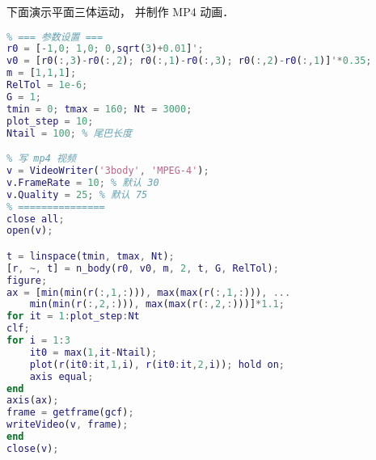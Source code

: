 下面演示平面三体运动， 并制作 MP4 动画．
\begin{lstlisting}[language=matlab, caption=three\_body.m]
% 平面三体运动演示
% === 参数设置 ===
r0 = [-1,0; 1,0; 0,sqrt(3)+0.01]';
v0 = [r0(:,3)-r0(:,2); r0(:,1)-r0(:,3); r0(:,2)-r0(:,1)]'*0.35;
m = [1,1,1];
RelTol = 1e-6;
G = 1;
tmin = 0; tmax = 160; Nt = 3000;
plot_step = 10;
Ntail = 100; % 尾巴长度

% 写 mp4 视频
v = VideoWriter('3body', 'MPEG-4');
v.FrameRate = 10; % 默认 30
v.Quality = 25; % 默认 75
% ===============
close all;
open(v);

t = linspace(tmin, tmax, Nt);
[r, ~, t] = n_body(r0, v0, m, 2, t, G, RelTol);
figure;
ax = [min(min(r(:,1,:))), max(max(r(:,1,:))), ...
    min(min(r(:,2,:))), max(max(r(:,2,:)))]*1.1;
for it = 1:plot_step:Nt
clf;
for i = 1:3
    it0 = max(1,it-Ntail);
    plot(r(it0:it,1,i), r(it0:it,2,i)); hold on;
    axis equal;
end
axis(ax);
frame = getframe(gcf);
writeVideo(v, frame);
end
close(v);
\end{lstlisting}
